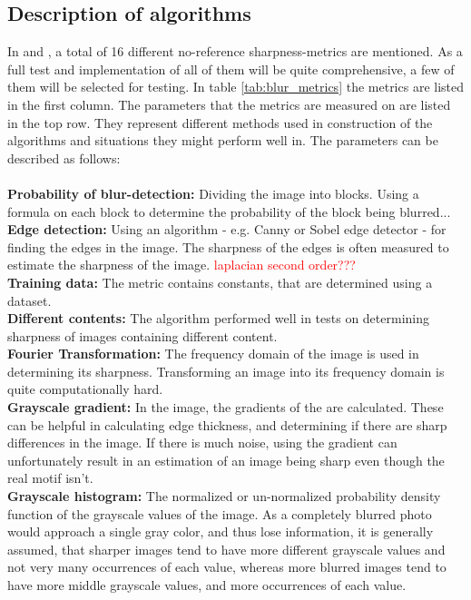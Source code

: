 \subsection{Description of algorithms}
In \cite{JNB} and \cite{FM}, a total of 16 different no-reference sharpness-metrics are mentioned. As a full test and implementation of all of them will be quite comprehensive, a few of them will be selected for testing. In table \ref{tab:blur_metrics} the metrics are listed in the first column. The parameters that the metrics are measured on are listed in the top row. They represent different methods used in construction of the algorithms and situations they might perform well in. The parameters can be described as follows:\\~\\
\textbf{Probability of blur-detection:}
Dividing the image into blocks. Using a formula on each block to determine the probability of the block being blurred...\\
\textbf{Edge detection:}
Using an algorithm - e.g. Canny or Sobel edge detector - for finding the edges in the image. The sharpness of the edges is often measured to estimate the sharpness of the image. \textcolor{red}{laplacian second order???}\\
\textbf{Training data:}
The metric contains constants, that are determined using a dataset.\\
\textbf{Different contents:}
The algorithm performed well in tests on determining sharpness of images containing different content.\\
\textbf{Fourier Transformation:}
The frequency domain of the image is used in determining its sharpness. Transforming an image into its frequency domain is quite computationally hard.\\
\textbf{Grayscale gradient:}
In the image, the gradients of the are calculated. These can be helpful in calculating edge thickness, and determining if there are sharp differences in the image. If there is much noise, using the gradient can unfortunately result in an estimation of an image being sharp even though the real motif isn't.\\
\textbf{Grayscale histogram:}
The normalized or un-normalized probability density function of the grayscale values of the image. As a completely blurred photo would approach a single gray color, and thus lose information, it is generally assumed, that sharper images tend to have more different grayscale values and not very many occurrences of each value, whereas more blurred images tend to have more middle grayscale values, and more occurrences of each value.\\
